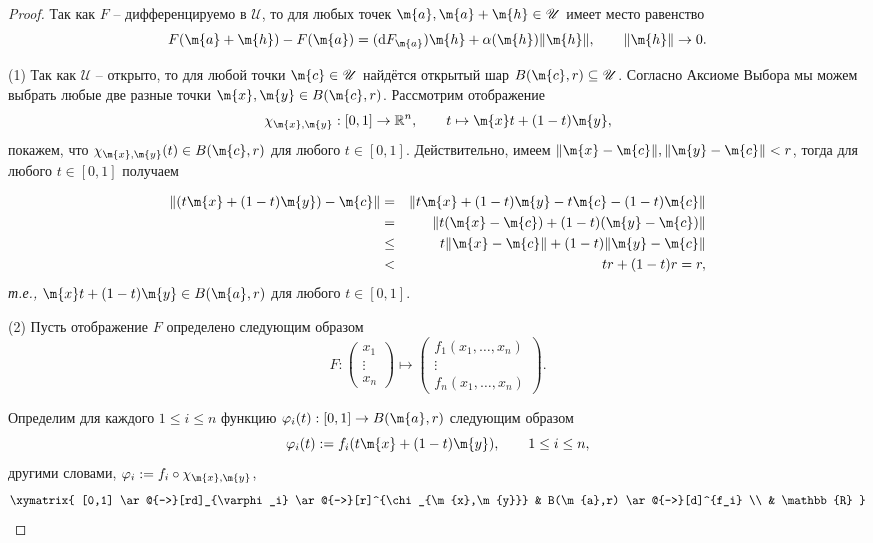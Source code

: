 \begin{proof}
    Так как $F$ -- дифференцируемо в $\mathscr{U}$, то для любых точек $\m{a}, \m{a}+\m{h} \in \mathscr{U}$ имеет место равенство
\[
F(\m{a} + \m{h}) - F(\m{a}) = (\mathrm{d}F_\m{a})\m{h} + \alpha(\m{h})\| \m{h}\|, \qquad \|\m{h}\| \to 0.
 \]

(1) Так как $\mathscr{U}$ -- открыто, то для любой точки $\m{c} \in \mathscr{U}$ найдётся открытый шар $B(\m{c},r) \subseteq \mathscr{U}$. Согласно Аксиоме Выбора мы можем выбрать любые две разные точки $\m{x},\m{y} \in B(\m{c},r)$. Рассмотрим отображение
\[
 \chi_{\m{x},\m{y}}: [0,1] \to \mathbb{R}^n, \qquad t \mapsto  \m{x}t + (1-t)\m{y},
\]
покажем, что $\chi_{\m{x},\m{y}}(t) \in B(\m{c},r)$ для любого $t \in [0,1]$. Действительно, имеем $\|\m{x} - \m{c}\|, \|\m{y} - \m{c}\| < r$, тогда для любого $t \in [0,1]$ получаем

\begin{eqnarray*}
  \| (t\m{x}+ (1-t)\m{y}) - \m{c}\| &=& \|  t\m{x}+ (1-t)\m{y}- t\m{c} - (1-t)\m{c}\|  \\
  &= & \| t(\m{x} - \m{c}) + (1-t)(\m{y} - \m{c})  \| \\
  &\le & t \| \m{x} - \m{c} \| + (1-t) \| \m{y}  -\m{c} \| \\
  &<& tr + (1-t)r = r,
\end{eqnarray*}
\textit{т.е.,} $\m{x}t + (1-t)\m{y} \in B(\m{a},r)$ для любого $t \in [0,1].$


(2) Пусть отображение $F$ определено следующим образом
\[
 F: \begin{pmatrix}
     x_1 \\ \vdots \\ x_n
 \end{pmatrix} \mapsto 
 \begin{pmatrix}
     f_1(x_1,\ldots, x_n) \\
     \vdots \\
     f_n(x_1,\ldots, x_n)
 \end{pmatrix}.
\]

Определим для каждого $1 \le i \le n$ функцию $\varphi_i(t):[0,1] \to B(\m{a}, r)$ следующим образом
\[
 \varphi_i(t): = f_i(t\m{x} + (1-t)\m{y}), \qquad 1\le i \le n,
\]
другими словами, $\varphi_i: = f_i \circ \chi_{\m{x},\m{y}}$,
\[
 \xymatrix{
  [0,1] \ar@{->}[rd]_{\varphi_i} \ar@{->}[r]^{\chi_{\m{x},\m{y}}} & B(\m{a},r) \ar@{->}[d]^{f_i} \\
  & \mathbb{R}
 }
\]


\end{proof}
